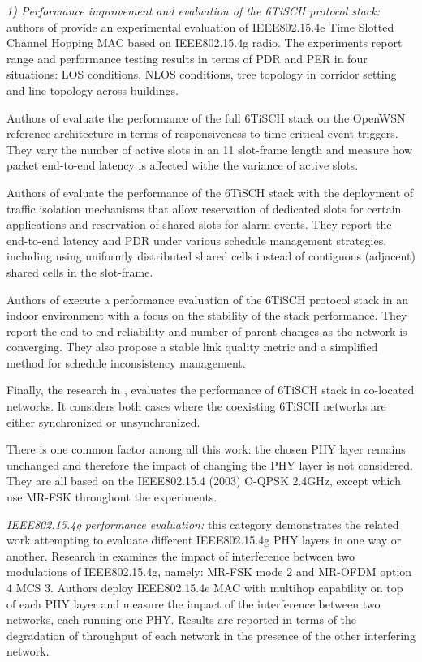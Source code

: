 \documentclass[journal]{IEEEtran}
\newcommand{\oqpsk}        {O-QPSK 2.4GHz}
\begin{document}
\textit{1) Performance improvement and evaluation of the 6TiSCH protocol stack:} authors of \cite{sum17experimental} provide an experimental evaluation of IEEE802.15.4e Time Slotted Channel Hopping MAC based on IEEE802.15.4g radio.
The experiments report range and performance testing results in terms of PDR and PER in four situations: LOS conditions, NLOS conditions, tree topology in corridor setting and line topology across buildings.

Authors of \cite{yang18analysis} evaluate the performance of the full 6TiSCH stack on the OpenWSN reference architecture in terms of responsiveness to time critical event triggers.
They vary the number of active slots in an 11 slot-frame length and measure how packet end-to-end latency is affected withe the variance of active slots. 

Authors of \cite{theoleyre16experimental} evaluate the performance of the 6TiSCH stack with the deployment of traffic isolation mechanisms that allow reservation of dedicated slots for certain applications and reservation of shared slots for alarm events.
They report the end-to-end latency and PDR under various schedule management strategies, including using uniformly distributed shared cells instead of contiguous (adjacent) shared cells in the slot-frame.

Authors of \cite{teleshermeto18reactions} execute a performance evaluation of the 6TiSCH protocol stack in an indoor environment with a focus on the stability of the stack performance.
They report the end-to-end reliability and number of parent changes as the network is converging.
They also propose a stable link quality metric and a simplified method for schedule inconsistency management. 

Finally, the research in \cite{benyaala16performance}, evaluates the performance of 6TiSCH stack in co-located networks.
It considers both cases where the coexisting 6TiSCH networks are either  synchronized or unsynchronized.

There is one common factor among all this work: the chosen PHY layer remains unchanged and therefore the impact of changing the PHY layer is not considered. 
They are all based on the IEEE802.15.4 (2003) \oqpsk , except \cite{sum17experimental} which use MR-FSK throughout the experiments. 


\textit{IEEE802.15.4g performance evaluation:} this category  demonstrates the related  work attempting to evaluate different IEEE802.15.4g PHY layers in one way or another.
Research in \cite{kojima15system} examines the impact of interference between two modulations of IEEE802.15.4g, namely: MR-FSK mode 2 and MR-OFDM option 4 MCS 3. 
Authors deploy IEEE802.15.4e MAC with multihop capability on top of each PHY layer and measure the impact of the interference between two networks, each running one PHY.
Results are reported in terms of the degradation of throughput of each network in the presence of the other interfering network.
\end{document}
